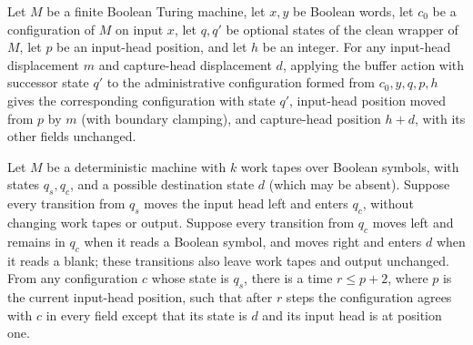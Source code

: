 \begin{lemma}
\label{Complexity.enumCont_buffer_apply}
\leanok
{}
Let $M$ be a finite Boolean Turing machine, let $x,y$ be Boolean words, let $c_0$ be a
configuration of $M$ on input $x$, let $q,q'$ be optional states of the clean wrapper of
$M$, let $p$ be an input-head position, and let $h$ be an integer. For any input-head
displacement $m$ and capture-head displacement $d$, applying the buffer action with
successor state $q'$ to the administrative configuration formed from $c_0,y,q,p,h$ gives
the corresponding configuration with state $q'$, input-head position moved from $p$ by
$m$ (with boundary clamping), and capture-head position $h+d$, with its other fields
unchanged.
\end{lemma}

\begin{lemma}
\label{Complexity.enumCont_rewind}
\leanok
{}
Let $M$ be a deterministic machine with $k$ work tapes over Boolean symbols, with states
$q_s,q_c$, and a possible destination state $d$ (which may be absent). Suppose every
transition from $q_s$ moves the input head left and enters $q_c$, without changing work
tapes or output. Suppose every transition from $q_c$ moves left and remains in $q_c$
when it reads a Boolean symbol, and moves right and enters $d$ when it reads a blank;
these transitions also leave work tapes and output unchanged. From any configuration $c$
whose state is $q_s$, there is a time $r\le p+2$, where $p$ is the current input-head
position, such that after $r$ steps the configuration agrees with $c$ in every field
except that its state is $d$ and its input head is at position one.
\end{lemma}

